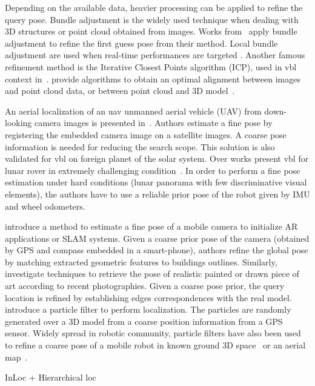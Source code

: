 Depending on the available data, heavier processing can be applied to refine the query pose. Bundle adjustment is the widely used technique when dealing with 3D structures or point cloud obtained from images. Works from~\citep{Middelberg2014,Wan2014,Forstner2016} apply bundle adjustment to refine the first guess pose from their method. Local bundle adjustment are used when real-time performances are targeted \citep{Li2010,Qu2016}. Another famous refinement method is the Iterative Closest Points algorithm (ICP), used in \ac{vbl} context in~\citep{Russell2011,Baatz2012,Morago2016}. \citet{Pani2015Lmi} provide algorithms to obtain an optimal alignment between images and point cloud data, or between point cloud and 3D model~\citep{Pani2015Robust}.

An aerial localization of an \ac{uav} unmanned aerial vehicle (UAV) from down-looking camera images is presented in~\citep{Wan2016}. Authors estimate a fine pose by registering the embedded camera image on a satellite images. A coarse pose information is needed for reducing the search scope. This solution is also validated for \ac{vbl} on foreign planet of the solar system. Over works present \ac{vbl} for lunar rover in extremely challenging condition~\citep{Wan2014}. In order to perform a fine pose estimation under hard conditions (lunar panorama with few discriminative visual elements), the authors have to use a reliable prior pose of the robot given by IMU and wheel odometers.

\citet{Arth2015} introduce a method to estimate a fine pose of a mobile camera to initialize AR applications or SLAM systems. Given a coarse prior pose of the camera (obtained by GPS and compass embedded in a smart-phone), authors refine the global pose by matching extracted geometric features to buildings outlines. Similarly, \citet{Russell2011} investigate techniques to retrieve the pose of realistic painted or drawn piece of art according to recent photographies. Given a coarse pose prior, the query location is refined by establishing edges correspondences with the real model. \citet{Poglitsch2015} introduce a particle filter to perform localization. The particles are randomly generated over a 3D model from a coarse position information from a GPS sensor. Widely spread in robotic community, particle filters have also been used to refine a coarse pose of a mobile robot in known ground 3D space~\citep{Mason2011} or an aerial map~\citep{Christie2016,Brubaker2016}.

InLoc + Hierarchical loc
